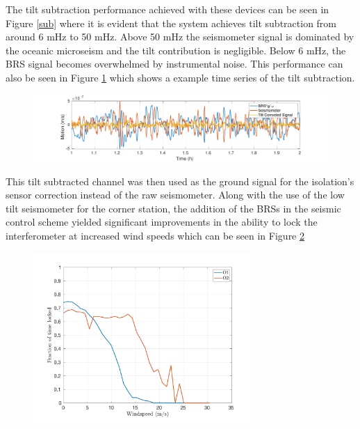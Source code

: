 \documentclass [12pt, proquest]{uwthesis}[2019]
\begin{document}
The tilt subtraction performance achieved with these devices can be seen in Figure \ref{sub} where it is evident that the system achieves tilt subtraction from around 6 mHz to 50 mHz. Above 50 mHz the seismometer signal is dominated by the oceanic microseism and the tilt contribution is negligible. Below 6 mHz, the BRS signal becomes overwhelmed by instrumental noise. This performance can also be seen in Figure \ref{subTime} which shows a example time series of the tilt subtraction. 

\begin{figure}%
\begin{center}
\includegraphics[width=\textwidth]{TiltCorrTime.pdf}
\caption{}
\label{subTime}
\end{center}
\end{figure}

This tilt subtracted channel was then used as the ground signal for the isolation's sensor correction instead of the raw seismometer. Along with the use of the low tilt seismometer for the corner station, the addition of the BRSs in the seismic control scheme yielded significant improvements in the ability to lock the interferometer at increased wind speeds which can be seen in Figure \ref{O2}

\begin{figure}%
\begin{center}
\includegraphics[width=0.75\textwidth]{Wind_LockedFraction_total.pdf}
\caption{}
\label{O2}
\end{center}
\end{figure}
\end{document}

